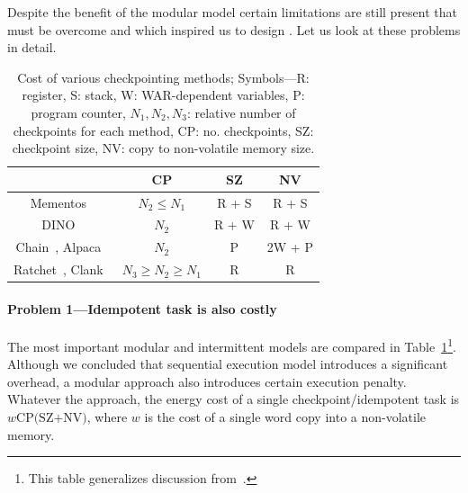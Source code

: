 Despite the benefit of the modular model certain limitations are still present that must be overcome and which inspired us to design \sys. Let us look at these problems in detail.

\begin{table}
	\centering
	\footnotesize
	\begin{tabular}{|c|c|c|c|}
		\hline
		{~} & CP & SZ & NV \\
		\hline\hline
		\!\!Mementos~\cite{mementos}\!\! & \!\!$N_2\leq N_1$\!\! & \!\!R + S\!\! & \!\!R + S\!\! \\
		\!\!DINO~\cite{dino}\!\! & $N_2$\!\! & \!\!R + W\!\! & \!\!R + W\!\! \\
		\!\!Chain~\cite{chain}, Alpaca~\cite{alpaca}\!\! & \!\!$N_2$\!\! & P\!\! & \!\!2W + P\!\!\\
		\!\!Ratchet~\cite{ratchet}, Clank~\cite{hicks_isca_2017}\!\! & $N_3\geq N_2\geq N_1$\!\! & \!\!R\!\! & R\!\!\\
		\hline 
	\end{tabular}
	\caption{Cost of various checkpointing methods; Symbols---R: register, S: stack, W: WAR-dependent variables, P: program counter, $N_1, N_2, N_3$: relative number of checkpoints for each method, CP: no. checkpoints, SZ: checkpoint size, NV: copy to non-volatile memory size.}
	\label{table:chechpoint_comparison}
\end{table}

\paragraph{Problem 1---Idempotent task is also costly}

The most important modular and intermittent models are compared in Table~\ref{table:chechpoint_comparison}\footnote{This table generalizes discussion from~\cite[Sec. 2.4]{alpaca}.}. Although we concluded that sequential execution model introduces a significant overhead, a modular approach also introduces certain execution penalty. Whatever the approach, the energy cost of a single checkpoint/idempotent task is $w\text{CP(SZ+NV)}$, where $w$ is the cost of a single word copy into a non-volatile memory. 

